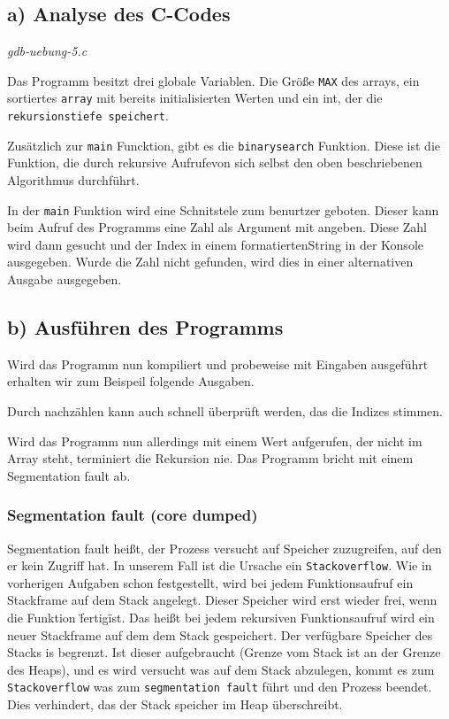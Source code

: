 \documentclass[12pt]{article}
\begin{document}
\subsection{a) Analyse des C-Codes}
\textit{gdb-uebung-5.c}



Das Programm besitzt drei globale Variablen. Die Größe \texttt{MAX} des arrays, ein sortiertes \texttt{array} mit bereits initialisierten Werten und ein int, der die \texttt{rekursionstiefe speichert}.

Zusätzlich zur \texttt{main} Funcktion, gibt es die \texttt{binarysearch} Funktion. Diese ist die Funktion, die durch rekursive Aufrufevon sich selbst den oben beschriebenen Algorithmus durchführt.

In der \texttt{main} Funktion wird eine Schnitstele zum benurtzer geboten. Dieser kann beim Aufruf des Programms eine Zahl als Argument mit angeben. Diese Zahl wird dann gesucht und der Index in einem formatiertenString in der Konsole ausgegeben. Wurde die Zahl nicht gefunden, wird dies in einer alternativen Ausgabe ausgegeben. 

\subsection{b) Ausführen des Programms}

Wird das Programm nun kompiliert und probeweise mit Eingaben ausgeführt erhalten wir zum Beispeil folgende Ausgaben.


Durch nachzählen kann auch schnell überprüft werden, das die Indizes stimmen.


Wird das Programm nun allerdings mit einem Wert aufgerufen, der nicht im Array steht, terminiert die Rekursion nie. Das Programm bricht mit einem Segmentation fault ab. 

\subsubsection{Segmentation fault (core dumped)}
Segmentation fault heißt, der Prozess versucht auf Speicher zuzugreifen, auf den er kein Zugriff hat. In unserem Fall ist die Ursache ein \texttt{Stackoverflow}. Wie in vorherigen Aufgaben schon festgestellt, wird bei jedem Funktionsaufruf ein Stackframe auf dem Stack angelegt. Dieser Speicher wird erst wieder frei, wenn die Funktion \"fertig\" ist. Das heißt bei jedem rekursiven Funktionsaufruf wird ein neuer Stackframe auf dem dem Stack gespeichert. Der verfügbare Speicher des Stacks is begrenzt. Ist dieser aufgebraucht (Grenze vom Stack ist an der Grenze des Heaps), und es wird versucht was auf dem Stack abzulegen, kommt es zum \texttt{Stackoverflow} was zum \texttt{segmentation fault} führt und den Prozess beendet. Dies verhindert, das der Stack speicher im Heap überschreibt.   
\end{document}

